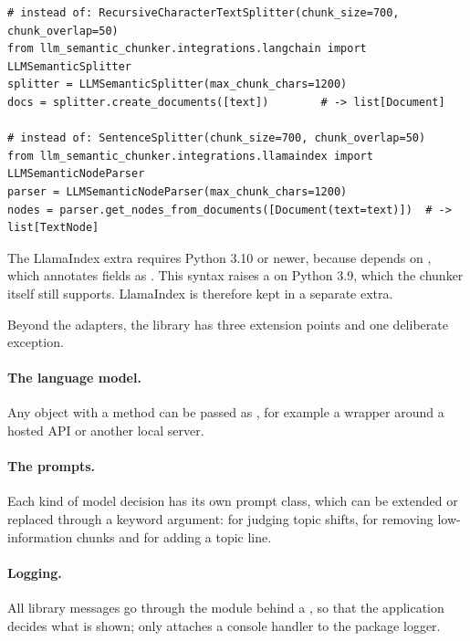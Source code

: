 \begin{lstlisting}[caption={Replacing an existing splitter. Only the constructor
line changes.},label={lst:adapters}]
# instead of: RecursiveCharacterTextSplitter(chunk_size=700, chunk_overlap=50)
from llm_semantic_chunker.integrations.langchain import LLMSemanticSplitter
splitter = LLMSemanticSplitter(max_chunk_chars=1200)
docs = splitter.create_documents([text])        # -> list[Document]

# instead of: SentenceSplitter(chunk_size=700, chunk_overlap=50)
from llm_semantic_chunker.integrations.llamaindex import LLMSemanticNodeParser
parser = LLMSemanticNodeParser(max_chunk_chars=1200)
nodes = parser.get_nodes_from_documents([Document(text=text)])  # -> list[TextNode]
\end{lstlisting}

The LlamaIndex extra requires Python 3.10 or newer, because 
depends on , which annotates fields as . This syntax raises a
 on Python 3.9, which the chunker itself still supports. LlamaIndex is
therefore kept in a separate extra.

Beyond the adapters, the library has three extension points and one deliberate exception.

\paragraph{The language model.} Any object with a  method can
be passed as , for example a wrapper around a hosted API or another local
server.

\paragraph{The prompts.} Each kind of model decision has its own prompt class, which can
be extended or replaced through a keyword argument:  for judging
topic shifts,  for removing low-information chunks and
 for adding a topic line.

\paragraph{Logging.} All library messages go through the  module behind a
, so that the application decides what is shown; 
only attaches a console handler to the package logger.

